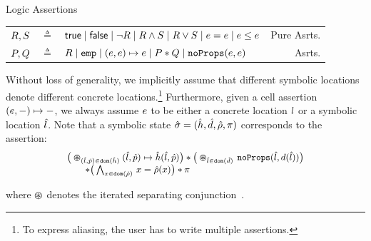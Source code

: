 
\vspace{2pt}
\begin{display}{\jsil Logic Assertions}
%
{\small
\begin{tabular}{r@{\ }c@{\ }lr}
  $R, S$ & $\triangleq$ & ${\sf true} \mid {\sf false} \mid  \neg R \mid R \land S \mid R \lor S \mid e = e \mid e \leq e$ & Pure Asrts. \\
  $P, Q$ & $\triangleq$ & $R \mid \texttt{emp} \mid (e, e)\mapsto e \mid P \mathbin{*} Q \mid \texttt{noProps}(e, e)$ & Asrts.
\end{tabular}}
\end{display}

\noindent Without loss of generality, we implicitly assume that different symbolic locations 
denote different concrete locations.\footnote{To express aliasing, the user has to write multiple assertions.}
 Furthermore, given a cell assertion $(e,-) \mapsto -$, we always assume 
 $e$ to be either a concrete location $l$ or a symbolic location $\hat{l}$. 
%
Note that 
a symbolic state $\hat{\sigma} = (\hat{h}, \hat{d}, \hat\rho, \pi)$ corresponds to the assertion:
\begin{equation*}
{\small \begin{array}{l}
\big(\varoast_{(\sloc, \sexprp) \in \domain(\sheap)} (\sloc, \sexprp) \mapsto \sheap(\sloc, \sexprp)\big) 
  \sep \big(\varoast_{\sloc \in \domain(\sdom)} \, \emptyfields{\sloc}{\idom(\sloc)}\big)  \\
 \qquad \sep \big(\bigwedge_{\jvar \in \domain(\sstore)} \, \jvar = \sstore(\jvar)\big) \sep \pc
\end{array}}
\end{equation*}

\noindent where $\varoast$ denotes the iterated separating conjunction~\cite{citeme}. 


